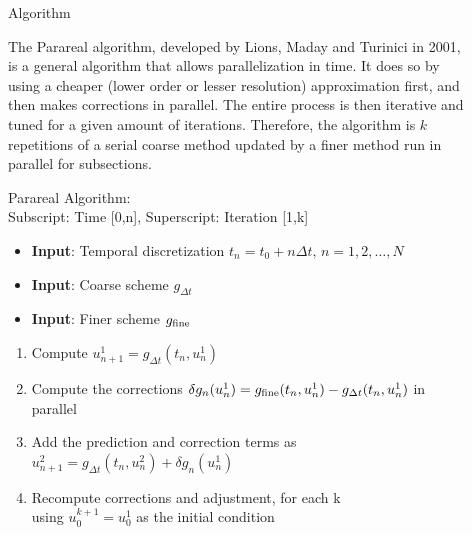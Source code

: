 \documentclass[final]{beamer}
\newlength{\sepwid}
\newlength{\onecolwid}
\begin{document}
\begin{frame}[t]
\begin{columns}[t]
\begin{column}{\onecolwid}
\begin{block}{Algorithm}

The Parareal algorithm, developed by Lions, Maday and Turinici in 2001, is
a general algorithm that allows parallelization in time. It does so by using a
cheaper (lower order or lesser resolution) approximation first, and then makes
corrections in parallel. The entire process is then iterative and tuned for a
given amount of iterations. Therefore, the algorithm is $k$ repetitions of a
serial coarse method updated by a finer method run in parallel for subsections.

Parareal Algorithm:\\
Subscript: Time [0,n], Superscript: Iteration [1,k]
\begin{itemize}
    \item \textbf{Input}: Temporal discretization $t_n = t_0 + n \Delta t, \, n =
        1,2,\ldots,N$
    \item \textbf{Input}: Coarse scheme $g_{\Delta t}$
    \item \textbf{Input}: Finer scheme $g_{\textnormal{fine}}$
\end{itemize}

\begin{enumerate}
    \item Compute $u^1_{n+1} = g_{\Delta t}(t_n, u^1_n)$
    \item Compute the corrections $\delta g_n(u^1_n) =
        g_{\textnormal{fine}}(t_n, u^1_n) - g_{\Delta t}(t_n, u^1_n)$ in parallel
    \item Add the prediction and correction terms as $u^2_{n+1} = g_{\Delta
        t}(t_n, u^2_n) + \delta g_n(u^1_n)$
    \item Recompute corrections and adjustment, for each k \\ using
        $u^{k+1}_0 = u^1_0$ as the initial condition
\end{enumerate}
\end{block}



\end{column} %

\begin{column}{\sepwid}\end{column} %

\begin{column}{\onecolwid} %


\end{column}
\end{columns}
\end{frame}
\end{document}
